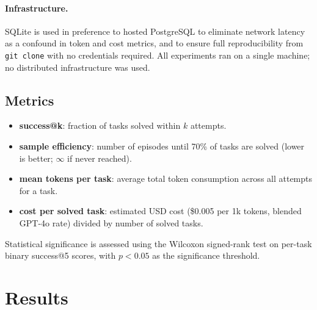 \documentclass{article}
\begin{document}
\paragraph{Infrastructure.}
SQLite is used in preference to hosted PostgreSQL to eliminate network
latency as a confound in token and cost metrics, and to ensure full
reproducibility from \texttt{git clone} with no credentials required. All
experiments ran on a single machine; no distributed infrastructure was used.

\subsection{Metrics}

\begin{itemize}
  \item \textbf{success@k}: fraction of tasks solved within $k$ attempts.
  \item \textbf{sample efficiency}: number of episodes until 70\% of tasks
    are solved (lower is better; $\infty$ if never reached).
  \item \textbf{mean tokens per task}: average total token consumption
    across all attempts for a task.
  \item \textbf{cost per solved task}: estimated USD cost (\$0.005 per 1k
    tokens, blended GPT-4o rate) divided by number of solved tasks.
\end{itemize}

Statistical significance is assessed using the Wilcoxon signed-rank test
on per-task binary success@5 scores, with $p < 0.05$ as the significance
threshold.

\section{Results}
\label{sec:results}
\end{document}
